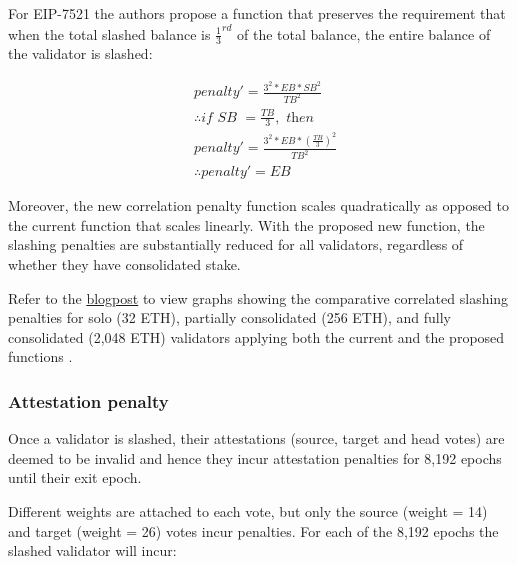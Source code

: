 For EIP-7521 the authors propose a function that preserves the requirement that when the total slashed balance is $\frac{1}{3}^{rd}$ of the total balance, the entire balance of the validator is slashed:

\begin{equation*}
\begin{split}
& penalty' = \frac{3^2 * EB * SB^2}{TB^2} \\
& \therefore \textit{if SB } = \frac{TB}{3}, \textit{ then} \\
& penalty' =   \frac{3^2 * EB * \left(  \frac{TB}{3} \right)^2 }{TB^2} \\
& \therefore penalty' = EB
\end{split}
\end{equation*}

Moreover, the new correlation penalty function scales quadratically as opposed to the current function that scales linearly. With the proposed new function, the slashing penalties are substantially reduced for all validators, regardless of whether they have consolidated stake.

Refer to the \href{https://notes.ethereum.org/@mikeneuder/slashings-eip-7251}{blogpost} to view graphs showing the comparative correlated slashing penalties for solo (32 ETH), partially consolidated (256 ETH), and fully consolidated (2,048 ETH) validators applying both the current and the proposed functions \cite{Neuder2023d}.

\subsubsection*{Attestation penalty}
Once a validator is slashed, their attestations (source, target and head votes) are deemed to be invalid and hence they incur attestation penalties for 8,192 epochs until their exit epoch. 

Different weights are attached to each vote, but only the source (weight = 14) and target (weight = 26) votes incur penalties. For each of the 8,192 epochs the slashed validator will incur:

